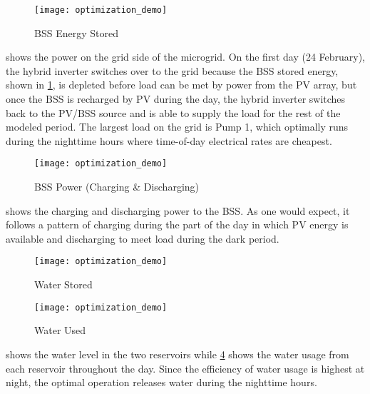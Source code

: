 \begin{figure}[t]
	\centering
	\texttt{[image: optimization\_demo]}
	\caption{BSS Energy Stored}
	\label{fig:bss-energy}
\end{figure}

 shows the power on the grid side of the microgrid.
On the first day (24 February), the hybrid inverter switches over to the grid because the BSS stored energy, shown in \cref{fig:bss-energy}, is depleted before load can be met by power from the PV array, but once the BSS is recharged by PV during the day, the hybrid inverter switches back to the PV/BSS source and is able to supply the load for the rest of the modeled period.
The largest load on the grid is Pump 1, which optimally runs during the nighttime hours where time-of-day electrical rates are cheapest.


\begin{figure}[t]
	\centering
	\texttt{[image: optimization\_demo]}
	\caption{BSS Power (Charging \& Discharging)}
	\label{fig:bss-power}
\end{figure}

 shows the charging and discharging power to the BSS.
As one would expect, it follows a pattern of charging during the part of the day in which PV energy is available and discharging to meet load during the dark period.


\begin{figure}[t]
	\centering
	\texttt{[image: optimization\_demo]}
	\caption{Water Stored}
	\label{fig:water-level}
\end{figure}

\begin{figure}[t]
	\centering
	\texttt{[image: optimization\_demo]}
	\caption{Water Used}
	\label{fig:water-used}
\end{figure}

 shows the water level in the two reservoirs while \cref{fig:water-used} shows the water usage from each reservoir throughout the day.
Since the efficiency of water usage is highest at night, the optimal operation releases water during the nighttime hours.


